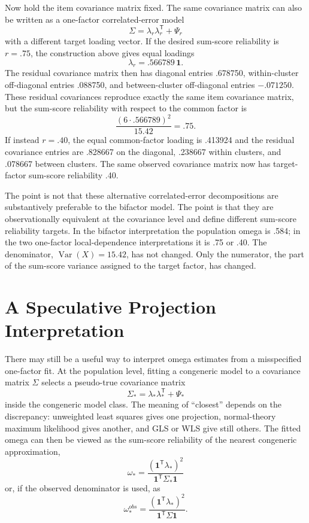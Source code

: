 \documentclass[11pt]{article}
\newcommand{\Var}{\operatorname{Var}}
\newcommand{\T}{^{\mathsf T}}
\newcommand{\one}{\mathbf{1}}
\begin{document}
Now hold the item covariance matrix fixed. The same covariance matrix can also
be written as a one-factor correlated-error model
\[
  \Sigma=\lambda_r\lambda_r\T+\Psi_r
\]
with a different target loading vector. If the desired sum-score reliability is
\(r=.75\), the construction above gives equal loadings
\[
  \lambda_r=.566789\,\one .
\]
The residual covariance matrix then has diagonal entries .678750,
within-cluster off-diagonal entries .088750, and between-cluster off-diagonal
entries \(-.071250\). These residual covariances reproduce exactly the same
item covariance matrix, but the sum-score reliability with respect to the
common factor is
\[
  \frac{(6\cdot .566789)^2}{15.42}=.75 .
\]
If instead \(r=.40\), the equal common-factor loading is .413924 and the
residual covariance entries are .828667 on the diagonal, .238667 within
clusters, and .078667 between clusters. The same observed covariance matrix now
has target-factor sum-score reliability .40.

The point is not that these alternative correlated-error decompositions are
substantively preferable to the bifactor model. The point is that they are
observationally equivalent at the covariance level and define different
sum-score reliability targets. In the bifactor interpretation the population
omega is .584; in the two one-factor local-dependence interpretations it is .75
or .40. The denominator, \(\Var(X)=15.42\), has not changed. Only the numerator,
the part of the sum-score variance assigned to the target factor, has changed.

\section{A Speculative Projection Interpretation}

There may still be a useful way to interpret omega estimates from a
misspecified one-factor fit. At the population level, fitting a congeneric model
to a covariance matrix \(\Sigma\) selects a pseudo-true covariance matrix
\[
  \Sigma_\ast=\lambda_\ast\lambda_\ast\T+\Psi_\ast
\]
inside the congeneric model class. The meaning of ``closest'' depends on the
discrepancy: unweighted least squares gives one projection, normal-theory
maximum likelihood gives another, and GLS or WLS give still others. The fitted
omega can then be viewed as the sum-score reliability of the nearest
congeneric approximation,
\[
  \omega_\ast
  =
  \frac{(\one\T\lambda_\ast)^2}{\one\T\Sigma_\ast\one}
\]
or, if the observed denominator is used, as
\[
  \omega_\ast^{obs}
  =
  \frac{(\one\T\lambda_\ast)^2}{\one\T\Sigma\one}.
\]
\end{document}
